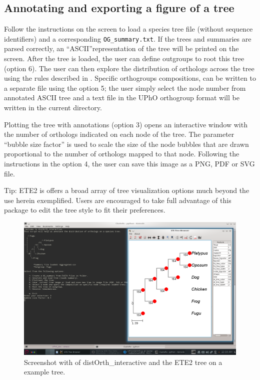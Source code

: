 \documentclass[10pt]{article}
\begin{document}
\subsection{Annotating and exporting a figure of a tree}
Follow the instructions on the screen to load a species tree file (without sequence identifiers) and a corresponding  \texttt{OG\_summary.txt}. If the trees and summaries are parsed correctly, an ``ASCII''representation of the tree will be printed on the screen. After the tree is loaded, the user can define outgroups to root this tree (option 6). The user can then explore the distribution of orthologs  across the tree using the rules  described in \citet{Ballesteros2016}. Specific orthogroups compositions, can be written to a separate file using the option 5; the user simply select the node number  from annotated ASCII tree and a text file in the UPhO orthogroup format will be written in the current directory. 

 Plotting the tree with annotations (option 3) opens an interactive window with the number of orthologs indicated on each node of the tree. The parameter ``bubble size factor'' is used to scale the size of the node bubbles that are drawn proportional to the number of orthologs mapped to that node. Following the instructions in the option 4, the user can save this image as a PNG, PDF or SVG file.

Tip: ETE2 is offers a broad array of tree visualization options much beyond the use herein exemplified. Users are encouraged to take full advantage of this package to edit the tree style to fit their preferences.

\begin{figure}
\includegraphics[width=\textwidth]{distOrthWithBub}
\caption{Screenshot with of distOrth\_interactive and the ETE2 tree on a example tree.}
\end{figure}
\end{document}
